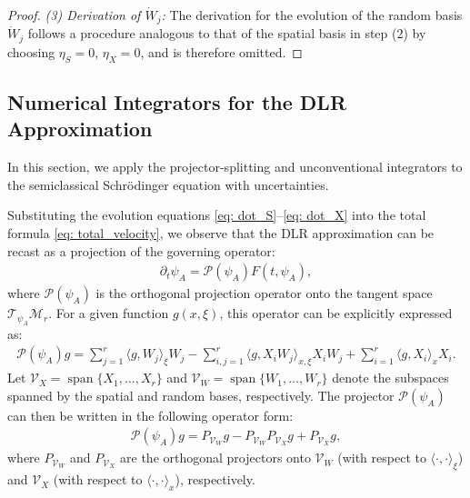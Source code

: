 \documentclass[preprint,11pt]{elsarticle}
\begin{document}
\begin{proof}
    \textit{(3) Derivation of $\dot{W}_j$:}
    The derivation for the evolution of the random basis $\dot{W}_j$ follows a procedure analogous to that of the spatial basis in step (2) by choosing $\eta_S = 0$, $\eta_X = 0$, and is therefore omitted.
\end{proof}

\subsection{Numerical Integrators for the DLR Approximation}
In this section, we apply the projector-splitting and unconventional integrators to the semiclassical Schrödinger equation with uncertainties. 

Substituting the evolution equations \eqref{eq: dot_S}--\eqref{eq: dot_X} into the total formula \eqref{eq: total_velocity}, we observe that the DLR approximation can be recast as a projection of the governing operator:
\begin{align}\label{eq: projected_F}
    \partial_t \psi_A = \mathcal{P}(\psi_A) F(t, \psi_A),
\end{align}
where $\mathcal{P}(\psi_A)$ is the orthogonal projection operator onto the tangent space $\mathcal{T}_{\psi_A} \mathcal{M}_r$. For a given function $g(x, \xi)$, this operator can be explicitly expressed as:
\begin{align}\label{eq: projector_expression}
    \mathcal{P}(\psi_A) g = \sum_{j=1}^{r} \langle g, W_j \rangle_{\xi} W_j - \sum_{i,j=1}^{r} \langle g, X_i W_j \rangle_{x,\xi} X_i W_j + \sum_{i=1}^{r} \langle g, X_i \rangle_{x} X_i.
\end{align}
Let $\mathcal{V}_X = \operatorname{span}\{X_1, \dots, X_r\}$ and $\mathcal{V}_W = \operatorname{span}\{W_1, \dots, W_r\}$ denote the subspaces spanned by the spatial and random bases, respectively. The projector $\mathcal{P}(\psi_A)$ can then be written in the following operator form:
\begin{align}\label{eq: projector_operator_form}
    \mathcal{P}(\psi_A) g = P_{\mathcal{V}_W} g - P_{\mathcal{V}_W} P_{\mathcal{V}_X} g + P_{\mathcal{V}_X} g,
\end{align}
where $P_{\mathcal{V}_W}$ and $P_{\mathcal{V}_X}$ are the orthogonal projectors onto $\mathcal{V}_W$ (with respect to $\langle \cdot, \cdot \rangle_{\xi}$) and $\mathcal{V}_X$ (with respect to $\langle \cdot, \cdot \rangle_{x}$), respectively.
\end{document}
